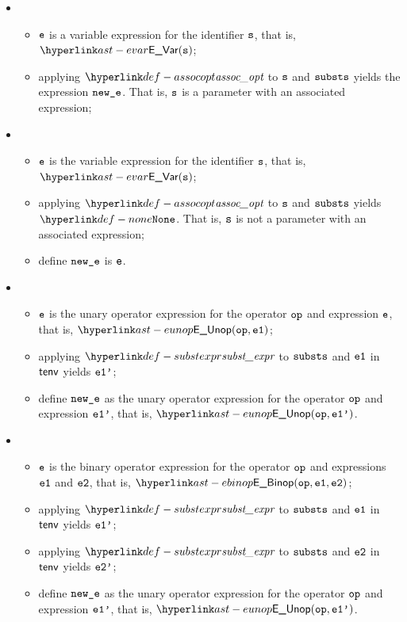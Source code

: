 \ProseParagraph
\OneApplies
\begin{itemize}
  \item {}
  \begin{itemize}
    \item $\texttt{e}$ is a variable expression for the identifier $\texttt{s}$, that is, $\EVar(\vs)$;
    \item applying $\assocopt$ to $\texttt{s}$ and $\texttt{substs}$ yields the expression $\texttt{new\_e}$.
          That is, $\texttt{s}$ is a parameter with an associated expression;
  \end{itemize}

  \item {}
  \begin{itemize}
    \item $\texttt{e}$ is the variable expression for the identifier $\texttt{s}$, that is, $\EVar(\vs)$;
    \item applying $\assocopt$ to $\texttt{s}$ and $\texttt{substs}$ yields $\None$.
          That is, $\texttt{s}$ is not a parameter with an associated expression;
    \item define $\texttt{new\_e}$ is $\texttt{e}$.
  \end{itemize}

  \item {}
  \begin{itemize}
    \item $\texttt{e}$ is the unary operator expression for the operator $\texttt{op}$ and expression $\texttt{e}$, that is, $\EUnop(\op, \veone)$;
    \item applying $\substexpr$ to $\texttt{substs}$ and $\texttt{e1}$ in $\textsf{tenv}$ yields $\texttt{e1'}$;
    \item define $\texttt{new\_e}$ as the unary operator expression for the operator $\texttt{op}$ and expression $\texttt{e1'}$, that is, $\EUnop(\op, \veonep)$.
  \end{itemize}

  \item {}
  \begin{itemize}
    \item $\texttt{e}$ is the binary operator expression for the operator $\texttt{op}$ and expressions $\texttt{e1}$ and $\texttt{e2}$, that is, $\EBinop(\op, \veone, \vetwo)$;
    \item applying $\substexpr$ to $\texttt{substs}$ and $\texttt{e1}$ in $\textsf{tenv}$ yields $\texttt{e1'}$;
    \item applying $\substexpr$ to $\texttt{substs}$ and $\texttt{e2}$ in $\textsf{tenv}$ yields $\texttt{e2'}$;
    \item define $\texttt{new\_e}$ as the unary operator expression for the operator $\texttt{op}$ and expression $\texttt{e1'}$, that is, $\EUnop(\op, \veonep)$.
  \end{itemize}


\end{itemize}
